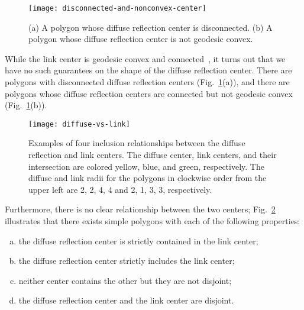 \documentclass[12pt]{article}
\begin{document}
 \begin{figure}[htbp]
    \centering
    \texttt{[image: disconnected-and-nonconvex-center]}
    \caption{(a) A polygon whose diffuse reflection center is disconnected.
    (b) A polygon whose diffuse reflection center is not geodesic convex.}
    \label{fig:disconnected-center}
  \end{figure}

\smallskip
{}
While the link center is geodesic convex and connected~\cite{LPS+88}, it turns out
that we have no such guarantees on the shape of the diffuse reflection center.
There are polygons with disconnected diffuse reflection centers (Fig.~\ref{fig:disconnected-center}(a)),
and there are polygons whose diffuse reflection centers are connected but not geodesic convex (Fig.~\ref{fig:disconnected-center}(b)).

\begin{figure}[hb!]
    \centering
    \texttt{[image: diffuse-vs-link]}
    \caption{Examples of four inclusion relationships between the diffuse reflection and link centers.
    The diffuse center, link centers, and their intersection are colored yellow, blue, and green, respectively.
    The diffuse and link radii for the polygons in clockwise order from the upper left are 2, 2, 4, 4 and 2, 1, 3, 3, respectively.}
    \label{fig:diffuse-vs-link}
\end{figure}

Furthermore, there is no clear relationship between the two centers;
Fig.~\ref{fig:diffuse-vs-link} illustrates that there exists simple polygons
with each of the following properties:
\begin{enumerate}[(a)] \itemsep2pt
\item the diffuse reflection center is strictly contained in the link center;
\item the diffuse reflection center strictly includes the link center;
\item neither center contains the other but they are not disjoint;
\item the diffuse reflection center and the link center are disjoint.
\end{enumerate}




\end{document}
